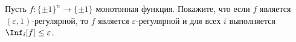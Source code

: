 Пусть $f\colon \{\pm 1\}^{n} \to \{\pm 1\}$ монотонная функция. Покажите, что если $f$ является
$(\varepsilon, 1)$-регулярной, то $f$ является $\varepsilon$-регулярной и для всех $i$ выполняется
$\Inf_i[f] \le \varepsilon$.